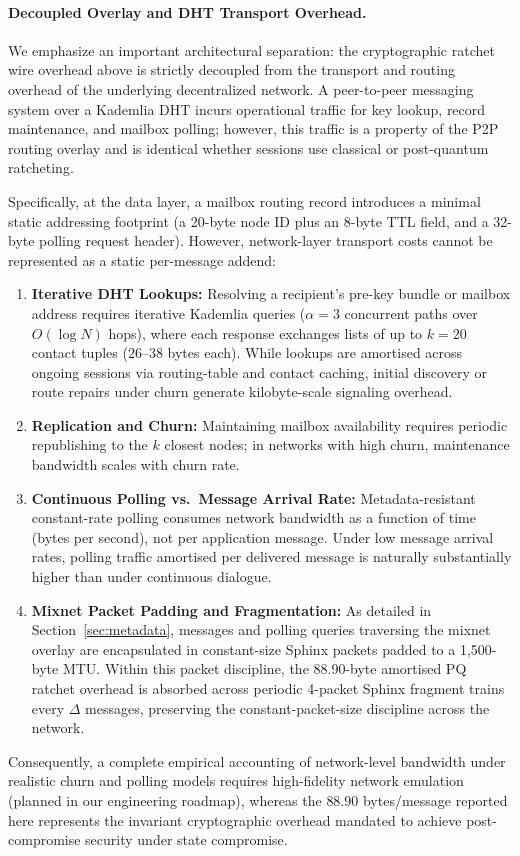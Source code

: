 \documentclass[11pt,a4paper]{article}
\theoremstyle{remark}
\theoremstyle{plain}
\begin{document}
\paragraph{Decoupled Overlay and DHT Transport Overhead.}
We emphasize an important architectural separation: the cryptographic ratchet wire overhead above is
strictly decoupled from the transport and routing overhead of the underlying decentralized network.
A peer-to-peer messaging system over a Kademlia DHT incurs operational traffic for key lookup,
record maintenance, and mailbox polling; however, this traffic is a property of the P2P routing
overlay and is identical whether sessions use classical or post-quantum ratcheting.

Specifically, at the data layer, a mailbox routing record introduces a minimal static addressing
footprint (a 20-byte node ID plus an 8-byte TTL field, and a 32-byte polling request header).
However, network-layer transport costs cannot be represented as a static per-message addend:
\begin{enumerate}
  \item \textbf{Iterative DHT Lookups:} Resolving a recipient's pre-key bundle or mailbox address
        requires iterative Kademlia queries ($\alpha = 3$ concurrent paths over $O(\log N)$ hops),
        where each response exchanges lists of up to $k = 20$ contact tuples ($26$--$38$ bytes each).
        While lookups are amortised across ongoing sessions via routing-table and contact caching,
        initial discovery or route repairs under churn generate kilobyte-scale signaling overhead.
  \item \textbf{Replication and Churn:} Maintaining mailbox availability requires periodic republishing
        to the $k$ closest nodes; in networks with high churn, maintenance bandwidth scales with churn rate.
  \item \textbf{Continuous Polling vs.\ Message Arrival Rate:} Metadata-resistant constant-rate polling
        consumes network bandwidth as a function of time (bytes per second), not per application message.
        Under low message arrival rates, polling traffic amortised per delivered message is naturally
        substantially higher than under continuous dialogue.
  \item \textbf{Mixnet Packet Padding and Fragmentation:} As detailed in Section~\ref{sec:metadata}, messages and
        polling queries traversing the mixnet overlay are encapsulated in constant-size Sphinx packets
        padded to a 1{,}500-byte MTU.  Within this packet discipline, the 88.90-byte amortised PQ ratchet
        overhead is absorbed across periodic 4-packet Sphinx fragment trains every $\Delta$ messages, preserving
        the constant-packet-size discipline across the network.
\end{enumerate}
Consequently, a complete empirical accounting of network-level bandwidth under realistic churn and
polling models requires high-fidelity network emulation (planned in our engineering roadmap),
whereas the $88.90$ bytes/message reported here represents the invariant cryptographic overhead
mandated to achieve post-compromise security under state compromise.
\end{document}

